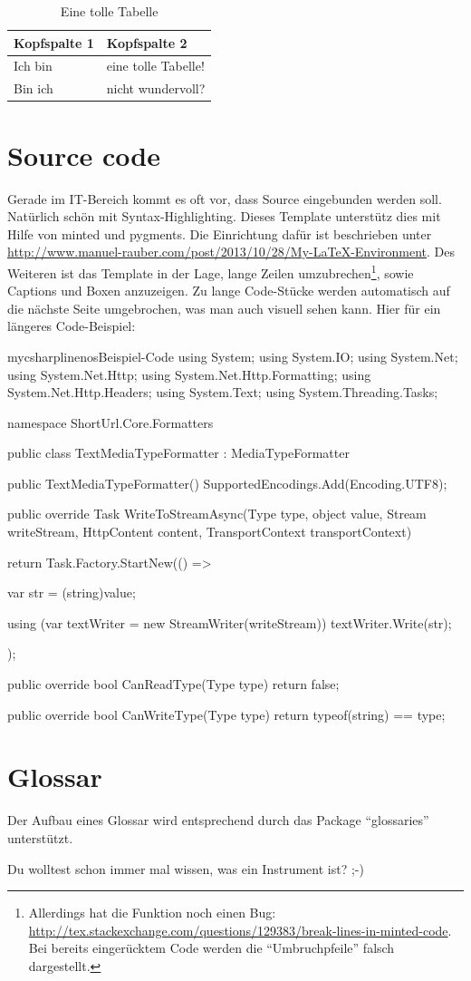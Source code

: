 \begin{table}[H]
\centering
\begin{tabular}{ll}
	\textbf{Kopfspalte 1} & \textbf{Kopfspalte 2} \\ \hline\hline
	Ich bin               & eine tolle Tabelle!   \\ \hline
	Bin ich               & nicht wundervoll?
\end{tabular}
\caption{Eine tolle Tabelle}
\end{table}

\section{Source code}

Gerade im IT-Bereich kommt es oft vor, dass Source eingebunden werden soll. Natürlich schön mit Syntax-Highlighting. 
Dieses Template unterstütz dies mit Hilfe von minted und pygments. Die Einrichtung dafür ist beschrieben unter \url{http://www.manuel-rauber.com/post/2013/10/28/My-LaTeX-Environment}.
Des Weiteren ist das Template in der Lage, lange Zeilen umzubrechen\footnote{Allerdings hat die Funktion noch einen Bug: \url{http://tex.stackexchange.com/questions/129383/break-lines-in-minted-code}. Bei bereits eingerücktem Code werden die \enquote{Umbruchpfeile} falsch dargestellt.}, sowie Captions und Boxen anzuzeigen. Zu lange Code-Stücke werden automatisch auf die nächste Seite umgebrochen, was man auch visuell sehen kann. Hier für ein längeres Code-Beispiel:

\begin{listingsbox}{mycsharplinenos}{Beispiel-Code}
using System;
using System.IO;
using System.Net;
using System.Net.Http;
using System.Net.Http.Formatting;
using System.Net.Http.Headers;
using System.Text;
using System.Threading.Tasks;

namespace ShortUrl.Core.Formatters
{
	public class TextMediaTypeFormatter : MediaTypeFormatter
	{
		public TextMediaTypeFormatter()
		{
			SupportedEncodings.Add(Encoding.UTF8);
		}

		public override Task WriteToStreamAsync(Type type, object value, Stream writeStream, HttpContent content,
			TransportContext transportContext)
		{
			return Task.Factory.StartNew(() =>
			{

				var str = (string)value;

				using (var textWriter = new StreamWriter(writeStream))
				{
					textWriter.Write(str);
				}
			});
		}

		public override bool CanReadType(Type type)
		{
			return false;
		}

		public override bool CanWriteType(Type type)
		{
			return typeof(string) == type;
		}
	}
}
\end{listingsbox}

\section{Glossar}

Der Aufbau eines Glossar wird entsprechend durch das Package \enquote{glossaries} unterstützt.

Du wolltest schon immer mal wissen, was ein \gls{Instrument} ist? ;-)
